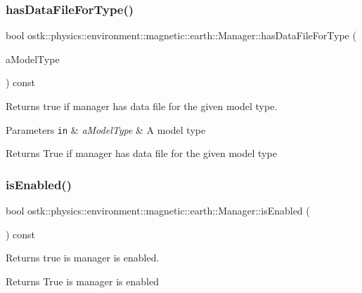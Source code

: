 \subsubsection{\texorpdfstring{has\+Data\+File\+For\+Type()}{hasDataFileForType()}}
{\footnotesize\ttfamily bool ostk\+::physics\+::environment\+::magnetic\+::earth\+::\+Manager\+::has\+Data\+File\+For\+Type (\begin{DoxyParamCaption}\item[{const \hyperlink{classostk_1_1physics_1_1environment_1_1magnetic_1_1_earth_a30a064d87b6fce338e76aebd3043b6b6}{Earth\+Magnetic\+Model\+::\+Type} \&}]{a\+Model\+Type }\end{DoxyParamCaption}) const}



Returns true if manager has data file for the given model type. 


\begin{DoxyParams}[1]{Parameters}
\mbox{\tt in}  & {\em a\+Model\+Type} & A model type \\
\hline
\end{DoxyParams}
\begin{DoxyReturn}{Returns}
True if manager has data file for the given model type 
\end{DoxyReturn}
\mbox{\label{classostk_1_1physics_1_1environment_1_1magnetic_1_1earth_1_1_manager_a8c18727649d0ab23d754a7f262b50852}} 
\subsubsection{\texorpdfstring{is\+Enabled()}{isEnabled()}}
{\footnotesize\ttfamily bool ostk\+::physics\+::environment\+::magnetic\+::earth\+::\+Manager\+::is\+Enabled (\begin{DoxyParamCaption}{ }\end{DoxyParamCaption}) const}



Returns true is manager is enabled. 

\begin{DoxyReturn}{Returns}
True is manager is enabled 
\end{DoxyReturn}
\mbox{\label{classostk_1_1physics_1_1environment_1_1magnetic_1_1earth_1_1_manager_a1f3acc969ac17edb717742281f2e761a}} 
